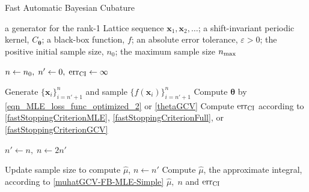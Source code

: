 \documentclass[twocolumn]{svjour3}          %
\newcommand{\bm}[1]{\boldsymbol{#1}}
\newcommand{\vtheta}{{\bm{\theta}}}
\newcommand{\vx}{\bm{x}}
\newcommand{\hmu}{\widehat{\mu}}
\newcommand{\err}{\textup{err}}
\begin{document}
\begin{algorithm}
	\caption{Fast Automatic Bayesian Cubature}\label{algorithm2}
	\begin{algorithmic}[1]
		\Require a generator for the rank-1 Lattice sequence
		$\vx_1, \vx_2, \ldots$; 
		a shift-invariant periodic kernel, $C_\vtheta$;
		a black-box function, $f$; 
		an absolute error tolerance,
		$\varepsilon>0$; the positive initial sample size, $n_0$;
		the maximum sample size $n_{\textup{max}}$
		
		\State $n \gets n_0, \; n' \gets 0, \; \err_{\textup{CI}} \gets \infty$
		
		\While{$\err_{\textup{CI}} > \varepsilon$ and $n \le n_{\textup{max}}$}
		
		\State\label{LoopStart}Generate $\{ \vx_i\}_{i=n' + 1}^{n}$ and sample $\{f(\vx_i)\}_{i=n'+1}^{n}$
		\State Compute $\vtheta$ by \eqref{eqn_MLE_loss_func_optimized_2} or \eqref{thetaGCV}
		\State Compute $\err_{\textup{CI}}$  according to \eqref{fastStoppingCriterionMLE}, \eqref{fastStoppingCriterionFull}, or \eqref{fastStoppingCriterionGCV}
		
		\State	$n' \gets n, \; n \gets 2n'$
		
		\EndWhile
		
		\State Update sample size to compute $\hmu$, $n \gets n'$
		\State Compute $\hmu$, the approximate integral,   according to \eqref{muhatGCV-FB-MLE-Simple}
		\State \Return $\hmu, \; n$  and $\err_{\textup{CI}}$
	\end{algorithmic}
\end{algorithm}
\end{document}
